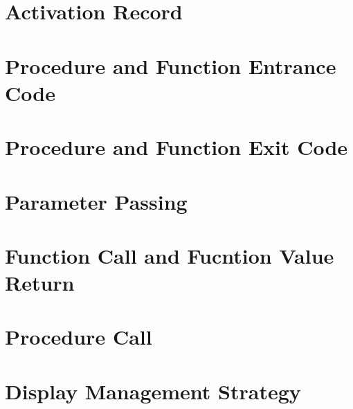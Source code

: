 \documentclass{article}
\begin{document}
\section{Activation Record}

\section{Procedure and Function Entrance Code}

\section{Procedure and Function Exit Code}

\section{Parameter Passing}

\section{Function Call and Fucntion Value Return}

\section{Procedure Call}

\section{Display Management Strategy}
\end{document}
